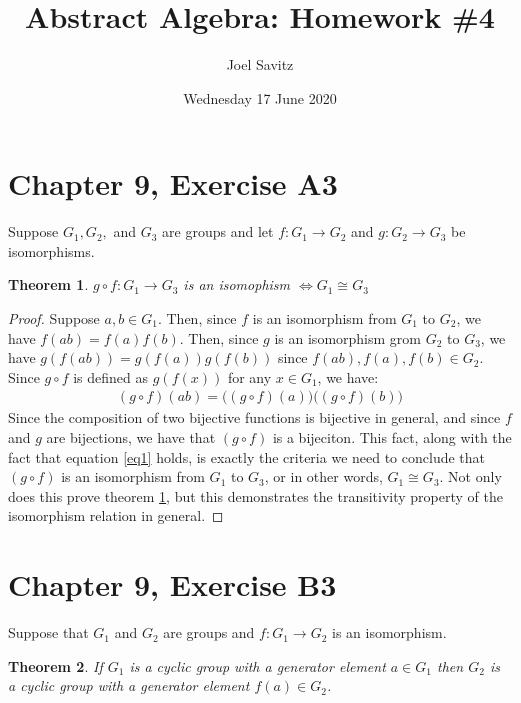 \documentclass[12pt]{article}
\title{Abstract Algebra: Homework \#4}
\author{Joel Savitz}
\date{Wednesday 17 June 2020}
\newtheorem{thm}{Theorem}
\begin{document}
\maketitle


\section{Chapter 9, Exercise A3}

Suppose $G_1, G_2,$ and $G_3$ are groups
and let $f:G_1 \to G_2$ and $g:G_2 \to G_3$ be isomorphisms.

\begin{thm} \label{thm1}
	$g \circ f: G_1 \to G_3$ is an isomophism $ \iff G_1 \cong G_3$
\end{thm}

\begin{proof}
	Suppose $a,b \in G_1$.
	Then, since $f$ is an isomorphism from $G_1$ to $G_2$,
	we have $f(ab) = f(a)f(b)$.
	Then, since $g$ is an isomorphism grom $G_2$ to $G_3$,
	we have $g(f(ab)) = g(f(a))g(f(b))$ since
	$f(ab),f(a),f(b) \in G_2$.
	Since $g \circ f$ is defined as $g(f(x))$
	for any $x \in G_1$, we have:
	\begin{align} \label{eq1}
	(g \circ f)(ab) = \big((g \circ f)(a)\big)\big((g \circ f)(b)\big)
	\end{align}
	Since the composition of two bijective functions is bijective
	in general, and since $f$ and $g$ are bijections,
	we have that $(g \circ f)$ is a bijeciton.
	This fact, along with the fact that equation \ref{eq1} holds,
	is exactly the criteria we need to conclude that
	$(g \circ f)$ is an isomorphism from $G_1$ to $G_3$,
	or in other words, $G_1 \cong G_3$.
	Not only does this prove theorem \ref{thm1},
	but this demonstrates the transitivity property
	of the isomorphism relation in general.
\end{proof}

\section{Chapter 9, Exercise B3}

Suppose that $G_1$ and $G_2$ are groups
and $f:G_1 \to G_2$ is an isomorphism.

\begin{thm} \label{thm2}
	If $G_1$ is a cyclic group with a generator element $a \in G_1$
	then $G_2$ is a cyclic group with a generator element $f(a) \in G_2$.
\end{thm}
\end{document}

